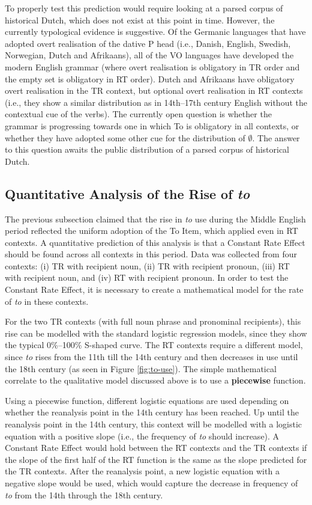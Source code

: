 	To properly test this prediction would require looking at a parsed corpus of historical Dutch, which does not exist at this point in time. However, the currently typological evidence is suggestive. Of the Germanic languages that have adopted overt realisation of the dative P head (i.e., Danish, English, Swedish, Norwegian, Dutch and Afrikaans), all of the VO languages have developed the modern English grammar (where overt realisation is obligatory in TR order and the empty set is obligatory in RT order). Dutch and Afrikaans have obligatory overt realisation in the TR context, but optional overt realisation in RT contexts (i.e., they show a similar distribution as in 14th--17th century English without the contextual cue of the verbs). The currently open question is whether the grammar is progressing towards one in which To is obligatory in all contexts, or whether they have adopted some other cue for the distribution of $\emptyset$. The answer to this question awaits the public distribution of a parsed corpus of historical Dutch.

	\subsection{Quantitative Analysis of the Rise of \textit{to}}
		The previous subsection claimed that the rise in \textit{to} use during the Middle English period reflected the uniform adoption of the To Item, which applied even in RT contexts. A quantitative prediction of this analysis is that a Constant Rate Effect should be found across all contexts in this period. Data was collected from four contexts: (i) TR with recipient noun, (ii) TR with recipient pronoun, (iii) RT with recipient noun, and (iv) RT with recipient pronoun. In order to test the Constant Rate Effect, it is necessary to create a mathematical model for the rate of \textit{to} in these contexts.
	
		For the two TR contexts (with full noun phrase and pronominal recipients), this rise can be modelled with the standard logistic regression models, since they show the typical 0\%--100\% S-shaped curve. The RT contexts require a different model, since \textit{to} rises from the 11th till the 14th century and then decreases in use until the 18th century (as seen in Figure \ref{fig:to-use}). The simple mathematical correlate to the qualitative model discussed above is to use a \textbf{piecewise} function. 
	
		Using a piecewise function, different logistic equations are used depending on whether the reanalysis point in the 14th century has been reached. Up until the reanalysis point in the 14th century, this context will be modelled with a logistic equation with a positive slope (i.e., the frequency of \textit{to} should increase). A Constant Rate Effect would hold between the RT contexts and the TR contexts if the slope of the first half of the RT function is the same as the slope predicted for the TR contexts. After the reanalysis point, a new logistic equation with a negative slope would be used, which would capture the decrease in frequency of \textit{to} from the 14th through the 18th century.

